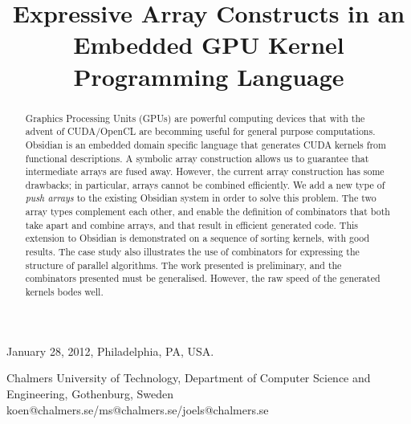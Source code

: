 \documentclass[]{sigplanconf}
\begin{document}
 {January 28, 2012, Philadelphia, PA, USA.}


\titlebanner{}        %
\preprintfooter{}   %

\title{Expressive Array Constructs in an Embedded GPU Kernel Programming Language}

           {Chalmers University of Technology, 
             Department of Computer Science and Engineering,
             Gothenburg, Sweden}
           {koen@chalmers.se/ms@chalmers.se/joels@chalmers.se}

\maketitle

\begin{abstract}


Graphics Processing Units (GPUs) are powerful computing devices 
that with the advent of CUDA/OpenCL are becomming useful for general 
purpose computations. 
Obsidian is an embedded domain specific language that generates CUDA kernels
from functional descriptions.
A symbolic array construction allows us to guarantee that intermediate
arrays are fused away. However, the current array construction has
some drawbacks; in particular, arrays cannot be combined efficiently.
We add a new type of {\em push arrays} to the existing Obsidian system in 
order to solve this problem. The two array types complement each other,
and enable the definition of combinators that both
take apart and combine arrays, and that result in efficient generated code.
This extension to Obsidian is demonstrated on a sequence of
sorting kernels, with good results.
The case study also illustrates the use of combinators for expressing
the structure of parallel algorithms.
The work presented is preliminary, and 
the combinators presented must be generalised.
However, the raw speed of the generated kernels bodes well.
\end{abstract}
\end{document}
